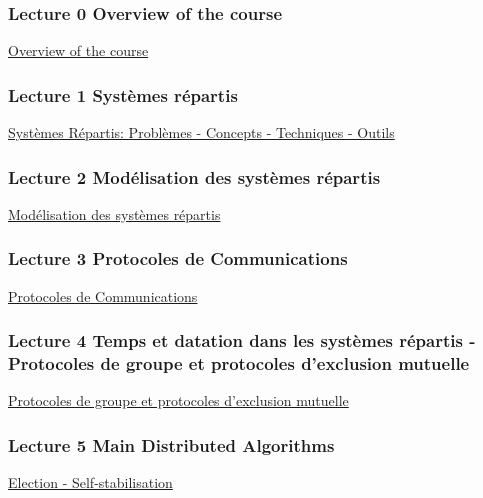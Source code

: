 \documentclass[ 12pt]{article}
\begin{document}
\subsubsection{Lecture 0 {Overview of the course }}
  
  \href{http://mery54.github.io/teaching/aspd/lecturesnotes/ASPD0.pdf}{Overview of the course }


\subsubsection{Lecture 1 {Systèmes répartis}}
  
\href{http://mery54.github.io/teaching/aspd/lecturesnotes/ASPD1.pdf}{Syst\`emes
  R\'epartis: Probl\`emes  - Concepts - Techniques - Outils}



\subsubsection{Lecture 2 {Mod\'elisation   des syst\`emes  r\'epartis}}
  
\href{http://mery54.github.io/teaching/aspd/lecturesnotes/ASPD2.pdf}{Mod\'elisation   des syst\`emes  r\'epartis}




\subsubsection{Lecture 3 {Protocoles de Communications}}
  
\href{http://mery54.github.io/teaching/aspd/lecturesnotes/ASPD3.pdf}{Protocoles de Communications}




\subsubsection{Lecture 4 Temps et datation  dans les syst\`emes 
  r\'epartis -  Protocoles de groupe et protocoles d'exclusion mutuelle }
  
\href{http://mery54.github.io/teaching/aspd/lecturesnotes/ASPD4.pdf}{Protocoles
  de groupe et protocoles d'exclusion mutuelle}


\subsubsection{Lecture 5  Main Distributed  Algorithms}
  
\href{http://mery54.github.io/teaching/aspd/lecturesnotes/ASPD5.pdf}{Election
  - Self-stabilisation}
\end{document}
